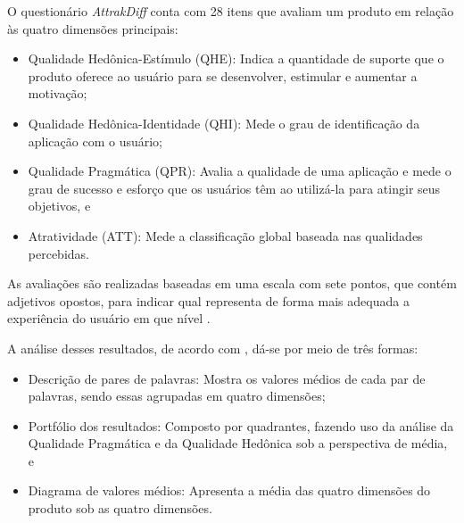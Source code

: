\begin{description}
\item O questionário \textit{AttrakDiff} conta com 28 itens que avaliam um produto em relação às quatro dimensões principais:
      \begin{itemize}
          \item Qualidade Hedônica-Estímulo (QHE): Indica a quantidade de suporte que o produto oferece ao usuário para se 
          desenvolver, estimular e aumentar a motivação;

          \item Qualidade Hedônica-Identidade (QHI): Mede o grau de identificação da aplicação com o usuário;

          \item Qualidade Pragmática (QPR): Avalia a qualidade de uma aplicação e mede o grau de sucesso e esforço que 
          os usuários têm ao utilizá-la para atingir seus objetivos, e

          \item Atratividade (ATT): Mede a classificação global baseada nas qualidades percebidas.
      \end{itemize}
\end{description}

As avaliações são realizadas baseadas em uma escala com sete pontos, que contém adjetivos opostos, para indicar qual 
representa de forma mais adequada a experiência do usuário em que nível \cite{natashatayana2015} \cite{hassenzahl2003}.

\begin{description}
    \item A análise desses resultados, de acordo com , dá-se por meio de três formas: 
          \begin{itemize}
              \item Descrição de pares de palavras: Mostra os valores médios de cada par de palavras, sendo essas agrupadas em quatro dimensões;
    
              \item Portfólio dos resultados: Composto por quadrantes, fazendo uso da análise da Qualidade Pragmática e da Qualidade 
              Hedônica sob a perspectiva de média, e
    
              \item Diagrama de valores médios: Apresenta a média das quatro dimensões do produto sob as quatro dimensões.
          \end{itemize}
\end{description}

